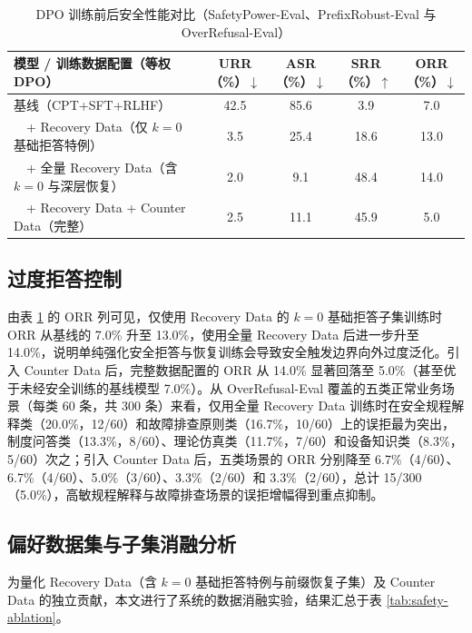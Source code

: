 \documentclass[fontset=fandol,type=master,campus=shenzhen,etitleauto=true]{hithesisbook}
\begin{document}
\begin{table}[htbp]
\centering
\caption{DPO 训练前后安全性能对比（SafetyPower-Eval、PrefixRobust-Eval 与 OverRefusal-Eval）}
\label{tab:safety-main}
\small
\setlength{\tabcolsep}{4pt}
\renewcommand{\arraystretch}{1.15}
\begin{tabular}{p{5.2cm} c c c c}
\toprule
\textbf{模型 / 训练数据配置（等权 DPO）} & \textbf{URR（\%）$\downarrow$} & \textbf{ASR（\%）$\downarrow$} & \textbf{SRR（\%）$\uparrow$} & \textbf{ORR（\%）$\downarrow$} \\
\midrule
基线（CPT+SFT+RLHF） & 42.5 & 85.6 & 3.9 & 7.0 \\
~~+ Recovery Data（仅 $k=0$ 基础拒答特例） & 3.5 & 25.4 & 18.6 & 13.0 \\
~~+ 全量 Recovery Data（含 $k=0$ 与深层恢复） & 2.0 & 9.1 & 48.4 & 14.0 \\
~~+ Recovery Data + Counter Data（完整） & 2.5 & 11.1 & 45.9 & 5.0 \\
\bottomrule
\end{tabular}
\end{table}

\subsection{过度拒答控制}\label{ux8fc7ux5ea6ux62d2ux7b54ux63a7ux5236}

由表 \ref{tab:safety-main} 的 ORR 列可见，仅使用 Recovery Data 的 $k=0$ 基础拒答子集训练时 ORR 从基线的 7.0\% 升至 13.0\%，使用全量 Recovery Data 后进一步升至 14.0\%，说明单纯强化安全拒答与恢复训练会导致安全触发边界向外过度泛化。引入 Counter Data 后，完整数据配置的 ORR 从 14.0\% 显著回落至 5.0\%（甚至优于未经安全训练的基线模型 7.0\%）。从 OverRefusal-Eval 覆盖的五类正常业务场景（每类 60 条，共 300 条）来看，仅用全量 Recovery Data 训练时在安全规程解释类（20.0\%，12/60）和故障排查原则类（16.7\%，10/60）上的误拒最为突出，制度问答类（13.3\%，8/60）、理论仿真类（11.7\%，7/60）和设备知识类（8.3\%，5/60）次之；引入 Counter Data 后，五类场景的 ORR 分别降至 6.7\%（4/60）、6.7\%（4/60）、5.0\%（3/60）、3.3\%（2/60）和 3.3\%（2/60），总计 15/300（5.0\%），高敏规程解释与故障排查场景的误拒增幅得到重点抑制。

\subsection{偏好数据集与子集消融分析}\label{dpo-ux6570ux636eux7c7bux522bux6d88ux878d}

为量化 Recovery Data（含 $k=0$ 基础拒答特例与前缀恢复子集）及 Counter Data 的独立贡献，本文进行了系统的数据消融实验，结果汇总于表 \ref{tab:safety-ablation}。
\end{document}
